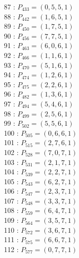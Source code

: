\documentclass{article}
\begin{document}
{\begin{multicols}{3}
87 : $P_{433}=( 0, 5, 5, 1 )$\\
88 : $P_{442}=( 1, 6, 5, 1 )$\\
89 : $P_{450}=( 1, 7, 5, 1 )$\\
90 : $P_{456}=( 7, 7, 5, 1 )$\\
91 : $P_{463}=( 6, 0, 6, 1 )$\\
92 : $P_{466}=( 1, 1, 6, 1 )$\\
93 : $P_{470}=( 5, 1, 6, 1 )$\\
94 : $P_{474}=( 1, 2, 6, 1 )$\\
95 : $P_{475}=( 2, 2, 6, 1 )$\\
96 : $P_{482}=( 1, 3, 6, 1 )$\\
97 : $P_{494}=( 5, 4, 6, 1 )$\\
98 : $P_{499}=( 2, 5, 6, 1 )$\\
99 : $P_{502}=( 5, 5, 6, 1 )$\\
100 : $P_{505}=( 0, 6, 6, 1 )$\\
101 : $P_{515}=( 2, 7, 6, 1 )$\\
102 : $P_{528}=( 7, 0, 7, 1 )$\\
103 : $P_{531}=( 2, 1, 7, 1 )$\\
104 : $P_{539}=( 2, 2, 7, 1 )$\\
105 : $P_{543}=( 6, 2, 7, 1 )$\\
106 : $P_{547}=( 2, 3, 7, 1 )$\\
107 : $P_{548}=( 3, 3, 7, 1 )$\\
108 : $P_{559}=( 6, 4, 7, 1 )$\\
109 : $P_{564}=( 3, 5, 7, 1 )$\\
110 : $P_{572}=( 3, 6, 7, 1 )$\\
111 : $P_{575}=( 6, 6, 7, 1 )$\\
112 : $P_{577}=( 0, 7, 7, 1 )$\\
\end{multicols}


%


%


}%
\end{document}
